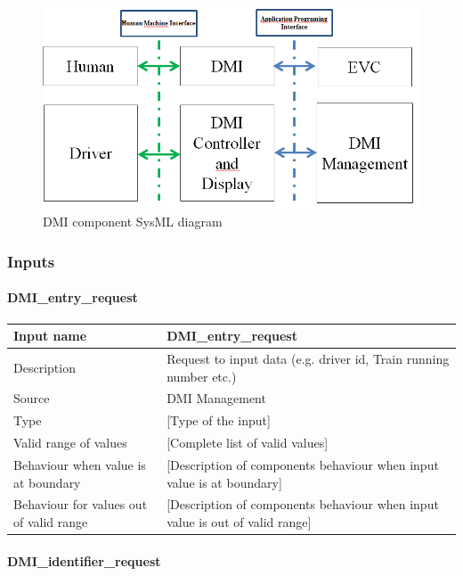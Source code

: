\begin{figure}
\center
\includegraphics[width=.8\textwidth]{images/DMI_Interfaces}
\caption{DMI component SysML diagram}\label{f:DMI_interface}
\end{figure}


\subsubsection{Inputs}\label{s:DMI_inputs}

\paragraph{DMI\_entry\_request}

\begin{longtable}{p{}p{}}
\toprule
Input name				& DMI\_entry\_request \\
\midrule
Description				& Request to input data (e.g. driver id, Train running number etc.) \\
\midrule
Source					& DMI Management \\ 
\midrule
Type					& [Type of the input] \\
\midrule
Valid range of values	& [Complete list of valid values] \\
\midrule
Behaviour when value is at boundary	& [Description of components behaviour when input value is at boundary] \\
\midrule
Behaviour for values out of valid range	& [Description of components behaviour when input value is out of valid range] \\
\bottomrule
\end{longtable}

\paragraph{DMI\_identifier\_request}

